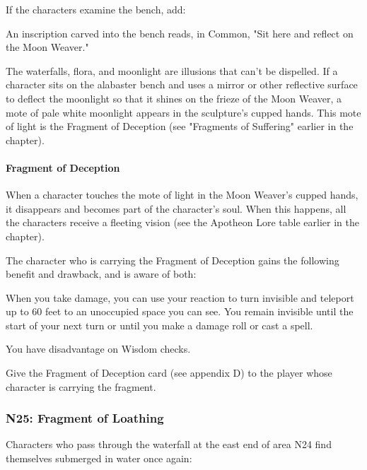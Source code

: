 \documentclass[10pt,a4paper,twoside,bg=print,twocolumn,openany,nodeprecatedcode]{dndbook}
\begin{document}
If the characters examine the bench, add:

\begin{DndReadAloud}{}
An inscription carved into the bench reads, in Common, "Sit here and reflect on the Moon Weaver."

\end{DndReadAloud}

The waterfalls, flora, and moonlight are illusions that can't be dispelled. If a character sits on the alabaster bench and uses a mirror or other reflective surface to deflect the moonlight so that it shines on the frieze of the Moon Weaver, a mote of pale white moonlight appears in the sculpture's cupped hands. This mote of light is the Fragment of Deception (see "Fragments of Suffering" earlier in the chapter).

\paragraph{Fragment of Deception}
When a character touches the mote of light in the Moon Weaver's cupped hands, it disappears and becomes part of the character's soul. When this happens, all the characters receive a fleeting vision (see the Apotheon Lore table earlier in the chapter).

The character who is carrying the Fragment of Deception gains the following benefit and drawback, and is aware of both:

\begin{DndComment}{}

\begin{description}[nolistsep]
\item[Benefit.]
When you take damage, you can use your reaction to turn invisible and teleport up to 60 feet to an unoccupied space you can see. You remain invisible until the start of your next turn or until you make a damage roll or cast a spell.
\item[Drawback.]
You have disadvantage on Wisdom checks.
\end{description}

\end{DndComment}

Give the Fragment of Deception card (see appendix D) to the player whose character is carrying the fragment.

\subsubsection{N25: Fragment of Loathing}
Characters who pass through the waterfall at the east end of area N24 find themselves submerged in water once again:
\end{document}

